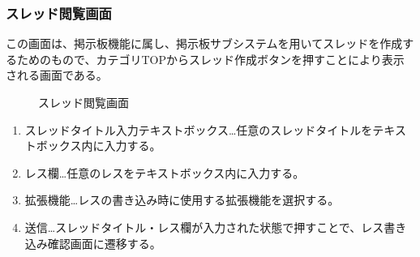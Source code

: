 \documentclass[a4j]{jarticle}
\begin{document}
\subsubsection{スレッド閲覧画面}
この画面は、掲示板機能に属し、掲示板サブシステムを用いてスレッドを作成するためのもので、カテゴリTOPからスレッド作成ボタンを押すことにより表示される画面である。\\
\begin{figure}[H]
\centering
{}
\caption{スレッド閲覧画面}
\label{fig:read_thread}
\end{figure}

\begin{enumerate}
  \renewcommand{\labelenumi}{\textcircled{\scriptsize \theenumi}}

\item スレッドタイトル入力テキストボックス…任意のスレッドタイトルをテキストボックス内に入力する。

\item レス欄…任意のレスをテキストボックス内に入力する。

\item 拡張機能…レスの書き込み時に使用する拡張機能を選択する。

\item 送信…スレッドタイトル・レス欄が入力された状態で押すことで、レス書き込み確認画面に遷移する。

\end{enumerate}
\end{document}
